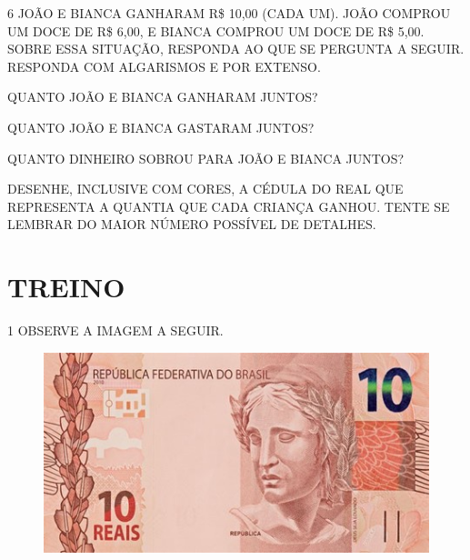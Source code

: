 
\pagebreak

\num{6} JOÃO E BIANCA GANHARAM R\$ 10,00 (CADA UM). JOÃO COMPROU UM DOCE DE R\$ 6,00,
E BIANCA COMPROU UM DOCE DE R\$ 5,00. SOBRE ESSA SITUAÇÃO, RESPONDA AO QUE SE PERGUNTA A SEGUIR. RESPONDA COM ALGARISMOS E POR EXTENSO.

\begin{escolha}
\item QUANTO JOÃO E BIANCA GANHARAM JUNTOS?


\item QUANTO JOÃO E BIANCA GASTARAM JUNTOS?


\item QUANTO DINHEIRO SOBROU PARA JOÃO E BIANCA JUNTOS?


\item DESENHE, INCLUSIVE COM CORES, A CÉDULA DO REAL QUE REPRESENTA A QUANTIA QUE CADA CRIANÇA GANHOU. TENTE SE LEMBRAR DO MAIOR NÚMERO POSSÍVEL DE DETALHES.
\end{escolha}

\begin{mdframed}[linewidth=2pt,linecolor=salmao,roundcorner=10pt]
\vspace{7.5cm}
\end{mdframed}

\pagebreak
\section*{TREINO}

\num{1} OBSERVE A IMAGEM A SEGUIR.


\begin{figure}[htpb!]
\centering
\includegraphics[width=.5\textwidth]{./media/SAEB_1ANO_MAT_FIGURA82.jpg}
\end{figure}

